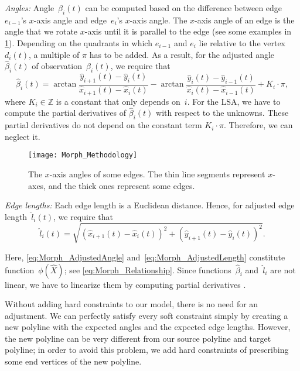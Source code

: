 \emph{Angles:} Angle~$\beta_{i}(t)$ can be computed based on 
the difference between edge~$e_{i - 1}$'s $x$-axis angle 
and edge~$e_{i}$'s $x$-axis angle. 
The $x$-axis angle of an edge is the angle that 
we rotate $x$-axis until it is parallel to the edge
(see some examples in \fig\ref{fig:Morph_AxisAngle}). 
Depending on the quadrants 
in which \(e_{i - 1}\) and \(e_{i}\) lie 
relative to the vertex $d_{i}(t)$, 
a multiple of \(\pi\) has to be added.
As a result, for the adjusted angle~$\hat{\beta}_{i}(t)$ 
of observation~$\beta_{i}(t)$,
we require that
\begin{equation}
\label{eq:Morph_AdjustedAngle}
\hat{\beta}_{i}(t) = 
\arctan\frac
{\hat{y}_{i+1}(t) - \hat{y}_{i}(t)}
{\hat{x}_{i+1}(t) - \hat{x}_{i}(t)} 
- 
\arctan\frac
{\hat{y}_{i}(t) - \hat{y}_{i-1}(t)}
{\hat{x}_{i}(t) - \hat{x}_{i-1}(t)} 
+
K_{i} \cdot \pi,
\end{equation}
where $K_{i}\in \mathbb{Z}$ 
is a constant that only depends on~$i$.
For the LSA, we have to compute the partial derivatives of 
$\hat{\beta}_{i}(t)$ with respect to the unknowns. 
These partial derivatives do not depend on the constant term
$K_{i} \cdot \pi$. 
Therefore, we can neglect it.

\begin{figure}[tb]
	\centering	
	\texttt{[image: Morph\_Methodology]}
	\caption{The $x$-axis angles of some edges.
		The thin line segments represent $x$-axes,
		and the thick ones represent some edges.
}
	\label{fig:Morph_AxisAngle}
\end{figure}

\emph{Edge lengths:} Each edge length is a Euclidean distance. 
Hence, for adjusted edge length~$\hat{l}_{i}(t)$, 
we require that
\begin{equation}
\label{eq:Morph_AdjustedLength}
\hat{l}_{i}(t) = 
\sqrt{
	(\hat{x}_{i + 1}(t) - \hat{x}_{i}(t))^2
	+ 
	(\hat{y}_{i + 1}(t) - \hat{y}_{i}(t))^2}.
\end{equation}

Here, \eqs\ref{eq:Morph_AdjustedAngle} 
and~\ref{eq:Morph_AdjustedLength} constitute
function~$\phi(\hat{X})$;
see \eq\ref{eq:Morph_Relationship}. 
Since functions~$\hat{\beta}_{i}$ 
and~$\hat{l}_{i}$ are not linear, 
we have to linearize them by computing partial derivatives
\parencite{Sester2000,Harrie2002}.

Without adding hard constraints to our model, 
there is no need for an adjustment. 
We can perfectly satisfy every soft constraint 
simply by creating a new polyline with 
the expected angles and the expected edge lengths. 
However, the new polyline can be very different 
from our source polyline and target polyline;
in order to avoid this problem,
we add hard constraints of
prescribing some end vertices of the new polyline.

